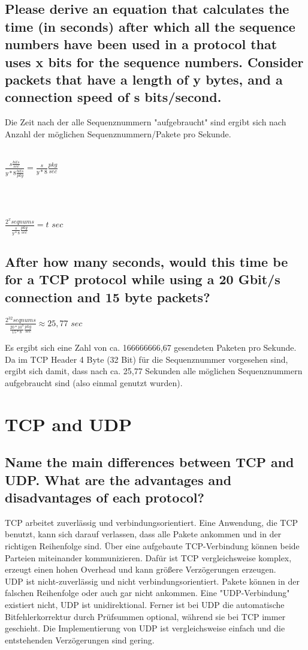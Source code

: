 \documentclass[a4paper,
			llpt,
			solution,
			accentcolor=tud2d,
			colorbacktitle
			]
			{tudexercise}
\begin{document}
\subsection{Please derive an equation that calculates the time (in seconds) after which all the sequence numbers have been used in a protocol that uses x bits for the sequence numbers. Consider packets that have a length of y bytes, and a connection speed of s bits/second.}
Die Zeit nach der alle Sequenznummern "aufgebraucht" sind ergibt sich nach Anzahl der möglichen Sequenznummern/Pakete pro Sekunde.
\\\\
\centerline{
$
    \frac{s \frac{bits}{sec}}{y*8\frac{bits}{pkg}} = \frac{s}{y*8} \frac{pkg}{sec}
$
}
\\
\\

\centerline{
$\frac{2^x seqnums}{\frac{s}{y*8} \frac{pkg}{sec}} = t$ $sec$
}
\subsection{After how many seconds, would this time be for a TCP protocol while using a 20 Gbit/s connection and 15 byte packets?}
\centerline{
$\frac{2^{32} seqnums}{\frac{20*10^9}{15*8} \frac{pkg}{sec}} \approx 25,77$ $sec$
}
Es ergibt sich eine Zahl von ca. 166666666,67 gesendeten Paketen pro Sekunde. Da im TCP Header 4 Byte (32 Bit) für die Sequenznummer vorgesehen sind, ergibt sich damit, dass nach ca. 25,77 Sekunden alle möglichen Sequenznummern aufgebraucht sind (also einmal genutzt wurden).
\section{TCP and UDP}
\subsection{Name the main differences between TCP and UDP. What are the advantages and disadvantages of each protocol?}
TCP arbeitet zuverlässig und verbindungsorientiert. Eine Anwendung, die TCP benutzt, kann sich darauf verlassen, dass alle Pakete ankommen und in der richtigen Reihenfolge sind. Über eine aufgebaute TCP-Verbindung können beide Parteien miteinander kommunizieren. Dafür ist TCP vergleichsweise komplex, erzeugt einen hohen Overhead und kann größere Verzögerungen erzeugen. \\
UDP ist nicht-zuverlässig und nicht verbindungsorientiert. Pakete können in der falschen Reihenfolge oder auch gar nicht ankommen. Eine "UDP-Verbindung" existiert nicht, UDP ist unidirektional. Ferner ist bei UDP die automatische Bitfehlerkorrektur durch Prüfsummen optional, während sie bei TCP immer geschieht. Die Implementierung von UDP ist vergleichsweise einfach und die entstehenden Verzögerungen sind gering.
\end{document}
